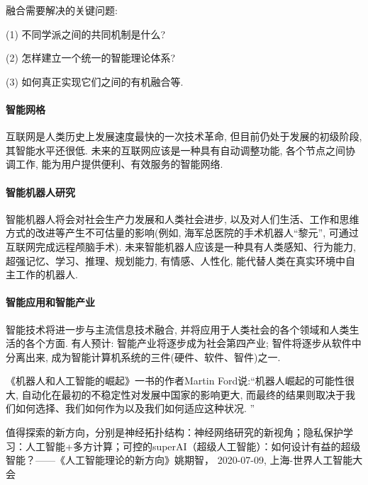 融合需要解决的关键问题:

(1) 不同学派之间的共同机制是什么?

(2) 怎样建立一个统一的智能理论体系?

(3) 如何真正实现它们之间的有机融合等.
\paragraph{智能网格}

互联网是人类历史上发展速度最快的一次技术革命, 但目前仍处于发展的初级阶段, 其智能水平还很低.
未来的互联网应该是一种具有自动调整功能, 各个节点之间协调工作, 能为用户提供便利、有效服务的智能网络.
\paragraph{智能机器人研究}

智能机器人将会对社会生产力发展和人类社会进步, 以及对人们生活、工作和思维方式的改进等产生不可估量的影响(例如, 海军总医院的手术机器人“黎元”, 可通过互联网完成远程颅脑手术).
未来智能机器人应该是一种具有人类感知、行为能力, 超强记忆、学习、推理、规划能力, 有情感、人性化, 能代替人类在真实环境中自主工作的机器人.
\paragraph{智能应用和智能产业}

智能技术将进一步与主流信息技术融合, 并将应用于人类社会的各个领域和人类生活的各个方面.
有人预计: 智能产业将逐步成为社会第四产业; 智件将逐步从软件中分离出来, 成为智能计算机系统的三件(硬件、软件、智件)之一.

《机器人和人工智能的崛起》一书的作者Martin Ford说:“机器人崛起的可能性很大, 自动化在最初的不稳定性对发展中国家的影响更大, 而最终的结果则取决于我们如何选择、我们如何作为以及我们如何适应这种状况. ”

值得探索的新方向，分别是神经拓扑结构：神经网络研究的新视角；隐私保护学习：人工智能+多方计算；可控的superAI（超级人工智能）：如何设计有益的超级智能？——《人工智能理论的新方向》姚期智， 2020-07-09, 上海-世界人工智能大会
